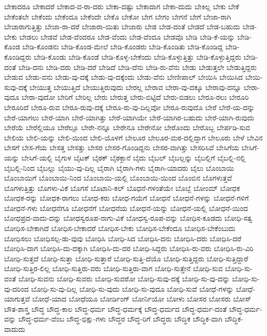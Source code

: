 {ಬೇಕಾದರೂ
ಬೇಕಾದರೆ
ಬೇಕಾದ-ವ-ರಾ-ದರು
ಬೇಕಾ-ದಷ್ಟು
ಬೇಕಾದಾಗ
ಬೇಕಾ-ದುದು
ಬೇಕಿಲ್ಲ
ಬೇಕು
ಬೇಕೆ
ಬೇಕೆಂತಲೇ
ಬೇಕೆಂದು
ಬೇಕೆಂದೂ
ಬೇಕೆಂದೇ
ಬೇಕೊ
ಬೇಕೋ
ಬೇಗ
ಬೇಗಂ
ಬೇಗನೆ
ಬೇಗೆ
ಬೇಜಾ-ರಾಗಿ
ಬೇಜಾರಾಗುತ್ತಿತ್ತು
ಬೇಜಾ-ರಾ-ದರೆ
ಬೇಜಾರಾ-ಯಿತು
ಬೇಜಾರು
ಬೇಡ
ಬೇಡ-ದಂತೆ
ಬೇಡದೆ
ಬೇಡ-ಬಹುದು
ಬೇಡ-ಬೇಕು
ಬೇಡಲು
ಬೇಡವೆ
ಬೇಡ-ವೆಂದರೂ
ಬೇಡ-ವೆಂದು
ಬೇಡ-ವೆಂದೂ
ಬೇಡವೊ
ಬೇಡಿ
ಬೇಡಿ-ಕೆ-ಯನ್ನು
ಬೇಡಿ-ಕೊಂಡ
ಬೇಡಿ-ಕೊಂಡನು
ಬೇಡಿ-ಕೊಂಡ-ಮೇಲೆ
ಬೇಡಿ-ಕೊಂಡರು
ಬೇಡಿ-ಕೊಂಡಿತು
ಬೇಡಿ-ಕೊಂಡಿದ್ದ
ಬೇಡಿ-ಕೊಂಡಿದ್ದರು
ಬೇಡಿ-ಕೊಂಡು
ಬೇಡಿ-ಕೊಂಡೆ
ಬೇಡಿ-ಕೊಳ್ಳ-ಬೇಕೆಂದು
ಬೇಡಿ-ಕೊಳ್ಳುತ್ತಿತ್ತು
ಬೇಡಿ-ಕೊಳ್ಳುತ್ತಿದ್ದರು
ಬೇಡಿ-ದಂತೆ
ಬೇಡಿ-ದನು
ಬೇಡಿ-ದರು
ಬೇಡಿ-ದರೆ
ಬೇಡಿದೆ
ಬೇಡಿ-ದೆನು
ಬೇಡಿ-ರು-ವೆನು
ಬೇಡು
ಬೇಡುತ್ತಲೇ
ಬೇಡುತ್ತಿದ್ದರು
ಬೇಡುವ
ಬೇಡು-ವನು
ಬೇಡು-ವು-ದಕ್ಕೆ
ಬೇಡು-ವು-ದಕ್ಕೆಂದು
ಬೇಡು-ವೆನು
ಬೇಣೀಪಾಲ್
ಬೇಯಿಸಿ
ಬೇಯಿಸಿದ
ಬೇಯಿ-ಸುವು-ದಕ್ಕೆ
ಬೇಯುತ್ತ
ಬೇಯುತ್ತಿದೆ
ಬೇಯುತ್ತಿರುವುದು
ಬೇರಲ್ಲ
ಬೇರಾವ
ಬೇರಾ-ವು-ದಕ್ಕೂ
ಬೇರಾವು-ದನ್ನೂ
ಬೇರಾ-ವುದೂ
ಬೇರಾ-ವುದೋ
ಬೇರಿಗೆ
ಬೇರಿಲ್ಲ
ಬೇರು
ಬೇರುತ್ತ
ಬೇರು-ಬಿಟ್ಟಿದೆ
ಬೇರು-ಬಿಡಲು
ಬೇರೂ-ರಲು
ಬೇರೂರಿ
ಬೇರೂರಿದೆ
ಬೇರೂ-ರುವ
ಬೇರೂ-ರುವು-ದಕ್ಕೆ
ಬೇರೂ-ರು-ವು-ದಿಲ್ಲವೋ
ಬೇರೂ-ರುವುದೊ
ಬೇರೆ
ಬೇರೆ-ಯ-ದನ್ನು
ಬೇರೆ-ಯಾಗಲು
ಬೇರೆ-ಯಾಗಿ
ಬೇರೆ-ಯಾಗಿತ್ತು
ಬೇರೆ-ಯಾಗಿಯೇ
ಬೇರೆ-ಯಾಗಿರ-ಬಹುದು
ಬೇರೆ-ಯಾಗಿ-ರುವುದು
ಬೇರೆಯೆ
ಬೇರೆಲ್ಲಿಯೂ
ಬೇರೆಲ್ಲೂ
ಬೇರೇ-ನನ್ನೂ
ಬೇರೇನೂ
ಬೇರೇನೋ
ಬೇರೊಂದು
ಬೇರೊಬ್ಬ
ಬೇರ್ಪಡಿ-ಸುವ
ಬೇಲಿಯ
ಬೇಲಿ-ಯನ್ನು
ಬೇಲಿ-ಯಿಂದ
ಬೇಲಿ-ಯೊಳಗೆ
ಬೇಲೂರ
ಬೇಲೂರ-ಮಠ-ದಲ್ಲಿದ್ದಾಗ
ಬೇಲೂರು
ಬೇಳೆ
ಬೇವಿನ
ಬೇಸಗೆ
ಬೇಸ-ಗೆಯ
ಬೇಸತ್ತ
ಬೇಸತ್ತು
ಬೇಸರ
ಬೇಸರ-ಗೊಂಡಿದ್ದನು
ಬೇಸರ-ವಾಗಿತ್ತು
ಬೇಸರಿಸಿವೆ
ಬೇಸಿಗೆಯ
ಬೇಸಿಗೆ-ಯನ್ನು
ಬೇಸಿಗೆ-ಯಲ್ಲಿ
ಬೈಗುಳ
ಬೈಟಕ್
ಬೈಠಕ್
ಬೈಠಕ್ಖಾನೆ
ಬೈದು
ಬೈಬಲ್
ಬೈಬಲ್ಲನ್ನು
ಬೈಬಲ್ಲಿಗೆ
ಬೈಬಲ್ಲಿ-ನಲ್ಲಿ
ಬೈಬಲ್ಲಿ-ನಿಂದ
ಬೈಬಲ್ಲು
ಬೈಯು-ವು-ದಿಲ್ಲ
ಬೈರಾಗಿ
ಬೈರಾಗಿ-ಗಳು
ಬೈರಾಗಿ-ಯಾದರು
ಬೈಲು
ಬೊಂಬಾಯಿ
ಬೊಂಬಾಯಿಗೆ
ಬೊಂಬಾಯಿ-ನಿಂದ
ಬೊಂಬಾಯಿ-ಯಲ್ಲಿ
ಬೊಂಬಾಯಿ-ಯಿಂದ
ಬೊಂಬಿನ
ಬೊಗಳುತ್ತವೆ
ಬೊಗಳುತ್ತಿತ್ತು
ಬೊಗಳು-ವಿಕೆ
ಬೊಗಸೆ
ಬೊಟಾನಿ-ಕಲ್
ಬೊಧನೆ-ಗಳಂತೆಯೇ
ಬೊಬ್ಬೆ
ಬೋಂಮ್
ಬೋಧಕ
ಬೋಧಕ-ರನ್ನು
ಬೋಧಕ-ರಾಗಲು
ಬೋಧ-ಕರು
ಬೋಧ-ಗಯೆಗೆ
ಬೋಧನೆ
ಬೋಧನೆ-ಗಳನ್ನು
ಬೋಧನೆ-ಗಳಿಗೆ
ಬೋಧನೆ-ಗಳು
ಬೋಧನೆಗೂ
ಬೋಧನೆಗೆ
ಬೋಧನೆಯ
ಬೋಧನೆ-ಯನ್ನು
ಬೋಧನೆ-ಯಲ್ಲಿ
ಬೋಧನೆ-ಯಿಂದ
ಬೋಧಪ್ರದ-ವಾದು-ದನ್ನು
ಬೋಧಸ್ವರೂಪ-ನಾಗು-ವಿಕೆ
ಬೋಧಸ್ವ-ರೂಪ-ವನ್ನು
ಬೋಧಿಸ-ಕೂಡದು
ಬೋಧಿ-ಸತ್ವ
ಬೋಧಿಸ-ಬೇಕಾಗಿದೆ
ಬೋಧಿಸ-ಬೇಕಾದರೆ
ಬೋಧಿಸ-ಬೇಕು
ಬೋಧಿಸ-ಬೇಕೆಂದೂ
ಬೋಧಿಸ-ಬೇಕೆಂಬುದು
ಬೋಧಿಸಲು
ಬೋಧಿಸಲ್ಪ-ಡು-ವುವು
ಬೋಧಿಸಿ
ಬೋಧಿ-ಸಿದ
ಬೋಧಿಸಿ-ದನು
ಬೋಧಿಸಿ-ದರು
ಬೋಧಿಸಿ-ದರೆ
ಬೋಧಿಸಿ-ದಾಗ
ಬೋಧಿಸಿ-ದು-ದಕ್ಕಾಗಿ
ಬೋಧಿಸಿ-ದು-ದರ
ಬೋಧಿ-ಸಿದ್ದರು
ಬೋಧಿಸಿ-ರು-ವರು
ಬೋಧಿಸಿ-ರು-ವಿರಿ
ಬೋಧಿ-ಸುತ್ತದೆ
ಬೋಧಿ-ಸುತ್ತಾ
ಬೋಧಿ-ಸುತ್ತಾರೆ
ಬೋಧಿ-ಸುತ್ತಿ-ದೆಯೊ
ಬೋಧಿ-ಸುತ್ತಿದ್ದರು
ಬೋಧಿ-ಸುತ್ತಿದ್ದಾರೆ
ಬೋಧಿ-ಸುತ್ತಿರ-ಲಿಲ್ಲ
ಬೋಧಿ-ಸುತ್ತಿರು-ವರು
ಬೋಧಿ-ಸುತ್ತಿರು-ವಾಗ
ಬೋಧಿ-ಸುತ್ತೇನೆ
ಬೋಧಿ-ಸುವ
ಬೋಧಿ-ಸು-ವಂತೆ
ಬೋಧಿ-ಸುವನು
ಬೋಧಿ-ಸುವರು
ಬೋಧಿ-ಸುವರೋ
ಬೋಧಿ-ಸುವು-ದಕ್ಕೆ
ಬೋಧಿ-ಸು-ವು-ದನ್ನು
ಬೋಧಿ-ಸು-ವು-ದರಿಂದ
ಬೋಧಿ-ಸು-ವು-ದಿಲ್ಲ
ಬೋಧಿ-ಸು-ವುದು
ಬೋಧಿ-ಸು-ವುದೂ
ಬೋಧಿ-ಸುವೆ
ಬೋಧೆ-ಗಳನ್ನು
ಬೋಧೆ-ಯಾಗುತ್ತವೆ
ಬೋಧೆ-ಯಾದ
ಬೋಧೆಯೂ
ಬೋರ್ಡಿಂಗ್
ಬೋರ್ನಿಯೋ
ಬೋಳು
ಬೋಸರ
ಬೋಸರು
ಬೋಸ್
ಬೌತ-ಶಾಸ್ತ್ರ
ಬೌದ್ಧ
ಬೌದ್ಧ-ಕಾಲ
ಬೌದ್ಧ-ಧರ್ಮ
ಬೌದ್ಧ-ಧರ್ಮಕ್ಕೆ
ಬೌದ್ಧ-ಧರ್ಮದ
ಬೌದ್ಧ-ಧರ್ಮ-ದಂತೆ
ಬೌದ್ಧ-ಧರ್ಮ-ವನ್ನು
ಬೌದ್ಧ-ಧರ್ಮ-ವೆಂಬ
ಬೌದ್ಧ-ಭಿಕ್ಷು-ಗಳು
ಬೌದ್ಧರ
ಬೌದ್ಧ-ರಿಗೆ
ಬೌದ್ಧರು
ಬೌದ್ಧಿಕ
ಬೌದ್ಧಿಕ-ವಾಗಿ
ಬೌದ್ಧಿಕ-ವಾದುದು
}
